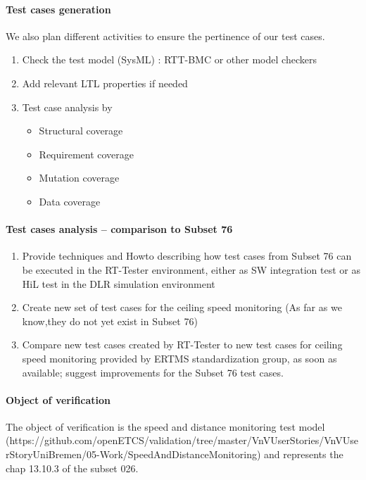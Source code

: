 \paragraph{Test cases generation}
We also plan different activities to ensure the pertinence of our test cases.
\begin{enumerate}
\item Check the test model (SysML) : RTT-BMC or other model checkers
\item Add relevant LTL properties if needed
\item Test case analysis by 
  \begin{itemize}
    \item Structural coverage
    \item Requirement coverage
    \item Mutation coverage 
    \item Data coverage
  \end{itemize}
\end{enumerate}

\paragraph{Test cases analysis -- comparison to Subset 76}
\begin{enumerate}
\item Provide techniques and Howto describing how test cases from
  Subset 76 can be executed in the RT-Tester environment, either as SW
  integration test or as HiL test in the DLR simulation environment
\item Create new set of test cases for the ceiling speed monitoring
  (As far as we know,they do not yet exist in Subset 76)
\item Compare new test cases created by RT-Tester to new test cases
  for ceiling speed monitoring provided by ERTMS standardization
  group, as soon as available; suggest improvements for the Subset 76
  test cases. 
 \end{enumerate}



\paragraph{Object of verification}
\nl
The object of verification is the speed and distance monitoring test model
(https://github.com/openETCS/validation/tree/master/VnVUserStories/VnVUserStoryUniBremen/05-Work/SpeedAndDistanceMonitoring)
and represents the chap 13.10.3 of the subset 026.



